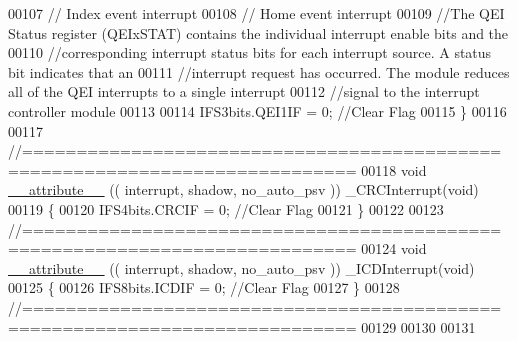 \begin{DoxyCode}
00107 \textcolor{comment}{// Index event interrupt}
00108 \textcolor{comment}{// Home event interrupt}
00109 \textcolor{comment}{//The QEI Status register (QEIxSTAT) contains the individual interrupt enable bits and the}
00110 \textcolor{comment}{//corresponding interrupt status bits for each interrupt source. A status bit indicates that an}
00111 \textcolor{comment}{//interrupt request has occurred. The module reduces all of the QEI interrupts to a single interrupt}
00112 \textcolor{comment}{//signal to the interrupt controller module}
00113 
00114 IFS3bits.QEI1IF = 0; \textcolor{comment}{//Clear Flag}
00115 \}
00116 
00117 \textcolor{comment}{//============================================================================}
00118 \textcolor{keywordtype}{void} \hyperlink{a00070_a226557d5e42f7e29ddaff30606138459}{\_\_attribute\_\_} (( interrupt, shadow, no\_auto\_psv )) \_CRCInterrupt(\textcolor{keywordtype}{void})
00119 \{
00120 IFS4bits.CRCIF = 0; \textcolor{comment}{//Clear Flag}
00121 \}
00122 
00123 \textcolor{comment}{//============================================================================}
00124 \textcolor{keywordtype}{void} \hyperlink{a00070_a226557d5e42f7e29ddaff30606138459}{\_\_attribute\_\_} (( interrupt, shadow, no\_auto\_psv )) \_ICDInterrupt(\textcolor{keywordtype}{void})
00125 \{
00126 IFS8bits.ICDIF = 0; \textcolor{comment}{//Clear Flag}
00127 \}
00128 \textcolor{comment}{//============================================================================}
00129 
00130 
00131 
\end{DoxyCode}
